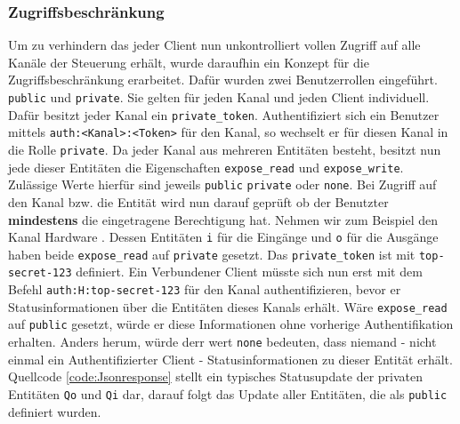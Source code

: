 \subsubsection{Zugriffsbeschränkung}\label{chp:ums:websock:auth}
Um zu verhindern das jeder Client nun unkontrolliert vollen Zugriff auf alle Kanäle der Steuerung erhält, wurde daraufhin ein Konzept für die Zugriffsbeschränkung erarbeitet. Dafür wurden zwei Benutzerrollen eingeführt. \texttt{public} und \texttt{private}. Sie gelten für jeden Kanal und jeden Client individuell. Dafür besitzt jeder Kanal ein \texttt{private\_token}. Authentifiziert sich ein Benutzer mittels \texttt{auth:<Kanal>:<Token>} für den Kanal, so wechselt er für diesen Kanal in die Rolle \texttt{private}. Da jeder Kanal aus mehreren Entitäten besteht, besitzt nun jede dieser Entitäten die Eigenschaften \texttt{expose\_read} und \texttt{expose\_write}. Zulässige Werte hierfür sind jeweils \texttt{public} \texttt{private} oder \texttt{none}. Bei Zugriff auf den Kanal bzw. die Entität wird nun darauf geprüft ob der Benutzter \textbf{mindestens} die eingetragene Berechtigung hat. Nehmen wir zum Beispiel den Kanal Hardware . Dessen Entitäten \texttt{i} für die Eingänge und \texttt{o} für die Ausgänge haben beide \texttt{expose\_read} auf \texttt{private} gesetzt. Das \texttt{private\_token} ist mit \texttt{top-secret-123} definiert. Ein Verbundener Client müsste sich nun erst mit dem Befehl \texttt{auth:H:top-secret-123} für den Kanal authentifizieren, bevor er Statusinformationen über die Entitäten dieses Kanals erhält. Wäre \texttt{expose\_read} auf \texttt{public} gesetzt, würde er diese Informationen ohne vorherige Authentifikation erhalten. Anders herum, würde derr wert \texttt{none} bedeuten, dass niemand - nicht einmal ein Authentifizierter Client - Statusinformationen zu dieser Entität erhält. Quellcode \ref{code:Jsonresponse} stellt ein typisches Statusupdate der privaten Entitäten \texttt{Qo} und \texttt{Qi} dar, darauf folgt das Update aller Entitäten, die als \texttt{public} definiert wurden.  

